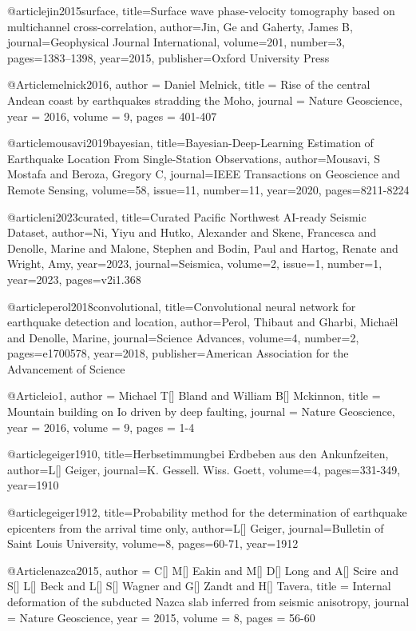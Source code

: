@article{jin2015surface,
  title={Surface wave phase-velocity tomography based on multichannel cross-correlation},
  author={Jin, Ge and Gaherty, James B},
  journal={Geophysical Journal International},
  volume={201},
  number={3},
  pages={1383--1398},
  year={2015},
  publisher={Oxford University Press}
}

@Article{melnick2016,
  author = 	 {Daniel Melnick},
  title = 	 {Rise of the central Andean coast by earthquakes stradding the Moho},
  journal = 	 {Nature Geoscience},
  year = 	 2016,
  volume = 9,
  pages =	 {401-407}
}

@article{mousavi2019bayesian,
  title={Bayesian-Deep-Learning Estimation of Earthquake Location From Single-Station Observations},
  author={Mousavi, S Mostafa and Beroza, Gregory C},
  journal={IEEE Transactions on Geoscience and Remote Sensing},
  volume=58,
  issue=11,
  number=11,
  year={2020},
  pages={8211-8224}
}

@article{ni2023curated,
  title={Curated Pacific Northwest AI-ready Seismic Dataset},
  author={Ni, Yiyu and Hutko, Alexander and Skene, Francesca and Denolle, Marine and Malone, Stephen and Bodin, Paul and Hartog, Renate and Wright, Amy},
  year={2023},
  journal={Seismica},
  volume=2,
  issue=1,
  number=1,
  year={2023},
  pages={v2i1.368}
}


@article{perol2018convolutional,
  title={Convolutional neural network for earthquake detection and location},
  author={Perol, Thibaut and Gharbi, Micha{\"e}l and Denolle, Marine},
  journal={Science Advances},
  volume={4},
  number={2},
  pages={e1700578},
  year={2018},
  publisher={American Association for the Advancement of Science}
}

@Article{io1,
  author = 	 {Michael T[] Bland and William B[] Mckinnon},
  title = 	 {Mountain building on {I}o driven by deep faulting},
  journal = 	 {Nature Geoscience},
  year = 	 2016,
  volume = 9,
  pages =	 {1-4}
}

@article{geiger1910,
  title={Herbsetimmungbei Erdbeben aus den Ankunfzeiten},
  author={L[] Geiger},
  journal={K. Gessell. Wiss. Goett},
  volume={4},
  pages={331-349},
  year={1910}
}

@article{geiger1912,
  title={Probability method for the determination of earthquake epicenters from the arrival time only},
  author={L[] Geiger},
  journal={Bulletin of Saint Louis University},
  volume={8},
  pages={60-71},
  year={1912}
}

@Article{nazca2015,
  author = 	 {C[] M[] Eakin and M[] D[] Long and A[] Scire and S[] L[] Beck and L[] S[] Wagner and G[] Zandt and H[] Tavera},
  title = 	 {Internal deformation of the subducted Nazca slab inferred from seismic anisotropy},
  journal = 	 {Nature Geoscience},
  year = 	 2015,
  volume = 8,
  pages =	 {56-60}
}

